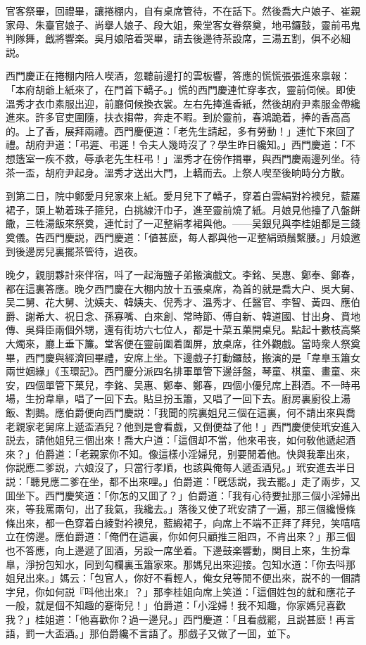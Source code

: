 官客祭畢，回禮畢，讓捲棚内，自有桌席管待，不在話下。然後喬大户娘子、崔親家母、朱臺官娘子、尚擧人娘子、段大姐，衆堂客女眷祭奠，地弔鑼鼓，靈前弔鬼判隊舞，戧將響楽。吳月娘陪着哭畢，請去後邊待茶設席，三湯五割，俱不必細説。

西門慶正在捲棚内陪人喫酒，忽聽前邊打的雲板響，答應的慌慌張張進來禀報：「本府胡爺上紙來了，在門首下轎子。」慌的西門慶連忙穿孝衣，靈前伺候。即使溫秀才衣巾素服出迎，前廳伺候換衣裳。左右先捧進香紙，然後胡府尹素服金帶纔進來。許多官吏圍隨，扶衣搊帶，奔走不暇。到於靈前，春鴻跪着，捧的香高高的。上了香，展拜兩禮。西門慶便道：「老先生請起，多有勞動！」連忙下來回了禮。胡府尹道：「弔遲、弔遲！令夫人幾時沒了？學生昨日纔知。」西門慶道：「不想簉室一疾不救，辱承老先生枉弔！」溫秀才在傍作揖畢，與西門慶兩邊列坐。待茶一盃，胡府尹起身。溫秀才送出大門，上轎而去。上祭人喫至後晌時分方散。

到第二日，院中鄭愛月兒家來上紙。愛月兒下了轎子，穿着白雲絹對衿襖兒，藍羅裙子，頭上勒着珠子箍兒，白挑線汗巾子，進至靈前燒了紙。月娘見他擡了八盤餅饊，三牲湯飯來祭奠，連忙討了一疋整絹孝裙與他。——吴銀兒與李桂姐都是三錢奠儀。告西門慶説，西門慶道：「値甚麽，每人都與他一疋整絹頭鬚繫腰。」月娘邀到後邊房兒裏擺茶管待，過夜。

晚夕，親朋夥計來伴宿，呌了一起海鹽子弟搬演戲文。李銘、吴惠、鄭奉、鄭春，都在這裏答應。晚夕西門慶在大棚内放十五張桌席，為首的就是喬大户、吳大舅、吴二舅、花大舅、沈姨夫、韓姨夫、倪秀才、溫秀才、任醫官、李智、黃四、應伯爵、謝希大、祝日念、孫寡嘴、白來創、常時節、傅自新、韓道國、甘出身、賁地傳、吳舜臣兩個外甥，還有街坊六七位人，都是十菜五菓開桌兒。點起十數枝高檠大燭來，廳上垂下簾。堂客便在靈前圍着圍屏，放桌席，往外觀戲。當時衆人祭奠畢，西門慶與經濟回畢禮，安席上坐。下邊戲子打動鑼鼓，搬演的是「韋臯玉簫女兩世姻緣」《玉環記》。西門慶分派四名排軍單管下邊㧱盤，琴童、棋童、畫童、來安，四個單管下菓兒，李銘、吴惠、鄭奉、鄭春，四個小優兒席上斟酒。不一時弔場，生扮韋臯，唱了一回下去。貼旦扮玉簫，又唱了一回下去。廚房裏廚役上湯飯、割鵝。應伯爵便向西門慶説：「我聞的院裏姐兒三個在這裏，何不請出來與喬老親家老舅席上遞盃酒兒？他到是會看戲，又倒便益了他！」西門慶便使玳安進入説去，請他姐兒三個出來！喬大户道：「這個却不當，他來弔丧，如何敎他遞起酒來？」伯爵道：「老親家你不知。像這樣小淫婦兒，别要閒着他。快與我牽出來，你説應二爹説，六娘沒了，只當行孝順，也該與俺每人遞盃酒兒。」玳安進去半日説：「聽見應二爹在坐，都不出來哩。」伯爵道：「旣恁説，我去罷。」走了兩步，又囬坐下。西門慶笑道：「你怎的又囬了？」伯爵道：「我有心待要扯那三個小淫婦出來，等我罵兩句，出了我氣，我纔去。」落後又使了玳安請了一遍，那三個纔慢條條出來，都一色穿着白綾對衿襖兒，藍緞裙子，向席上不端不正拜了拜兒，笑嘻嘻立在傍邊。應伯爵道：「俺們在這裏，你如何只顧推三阻四，不肯出來？」那三個也不答應，向上邊遞了囬酒，另設一席坐着。下邊鼓楽響動，関目上來，生扮韋臯，淨扮包知水，同到勾欄裏玉簫家來。那媽兒出來迎接。包知水道：「你去呌那姐兒出來。」媽云：「包官人，你好不看輕人，俺女兒等閒不便出來，説不的一個請字兒，你如何説『呌他出來』？」那李桂姐向席上笑道：「這個姓包的就和應花子一般，就是個不知趣的蹇衛兒！」伯爵道：「小淫婦！我不知趣，你家媽兒喜歡我？」桂姐道：「他喜歡你？過一邊兒。」西門慶道：「且看戲罷，且説甚麽！再言語，罰一大盃酒。」那伯爵纔不言語了。那戲子又做了一囬，並下。

